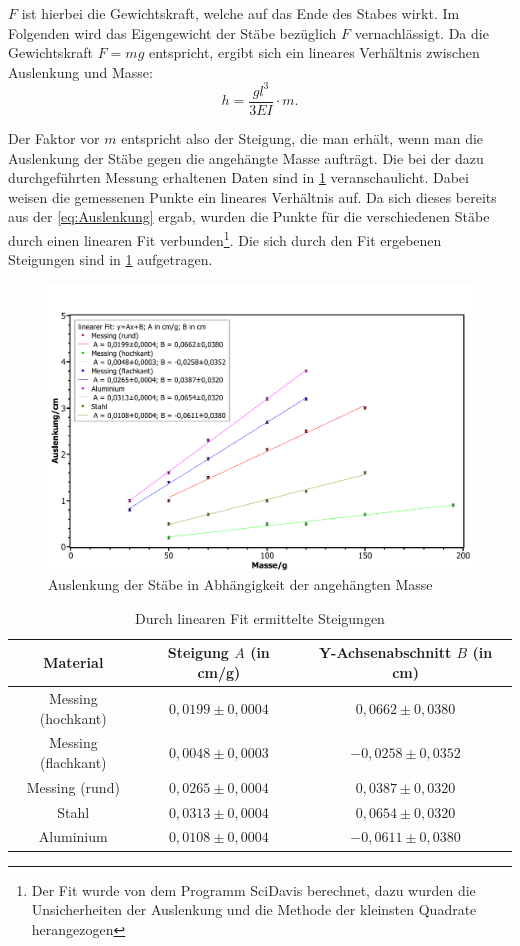 	$F$ ist hierbei die Gewichtskraft, welche auf das Ende des Stabes wirkt. Im Folgenden wird das Eigengewicht der Stäbe bezüglich $F$ vernachlässigt.
	Da die Gewichtskraft $F = mg$ entspricht, ergibt sich ein lineares Verhältnis zwischen Auslenkung und Masse:
	\begin{equation}
	h = \frac{gl^3}{3EI}\cdot m. \label{eq:Auslenkung}
	\end{equation}
	
	Der Faktor vor $m$ entspricht also der Steigung, die man erhält, wenn man die Auslenkung der Stäbe gegen die angehängte Masse aufträgt. Die bei der dazu durchgeführten Messung erhaltenen Daten sind in \cref{abb:linearerFit} veranschaulicht.		
	Dabei weisen die gemessenen Punkte ein lineares Verhältnis auf. Da sich dieses bereits aus der \cref{eq:Auslenkung} ergab, wurden die Punkte für die verschiedenen Stäbe durch einen linearen Fit verbunden\footnote{Der Fit wurde von dem Programm SciDavis berechnet, dazu wurden die Unsicherheiten der Auslenkung und die Methode der kleinsten Quadrate herangezogen}. Die sich durch den Fit ergebenen Steigungen sind in \cref{tab:Steigungen} aufgetragen.
	\begin{figure}[ht]
		\centering
		\includegraphics[width=\textwidth]{StabAuslenkungen.pdf}
		\caption{Auslenkung der Stäbe in Abhängigkeit der angehängten Masse}
		\label{abb:linearerFit}	
	\end{figure}
	\begin{table}[ht]
		\caption{Durch linearen Fit ermittelte Steigungen}
		\centering
		\label{tab:Steigungen}
		\begin{tabular}{c|c|c}
			{Material} & {Steigung $A$ (in cm/g)} & {Y-Achsenabschnitt $B$ (in cm)} \\
			\hline
			{Messing (hochkant)} & {$0,0199\pm 0,0004$} & {$0,0662\pm 0,0380$} \\
			{Messing (flachkant)} & {$0,0048\pm 0,0003$} & {$-0,0258\pm 0,0352$} \\
			{Messing (rund)} & {$0,0265\pm 0,0004$} & {$0,0387\pm 0,0320$} \\
			{Stahl} & {$0,0313\pm 0,0004$} & {$0,0654\pm 0,0320$} \\
			{Aluminium} & {$0,0108\pm 0,0004$} & {$-0,0611\pm 0,0380$} \\	
		\end{tabular}
	\end{table}
	
